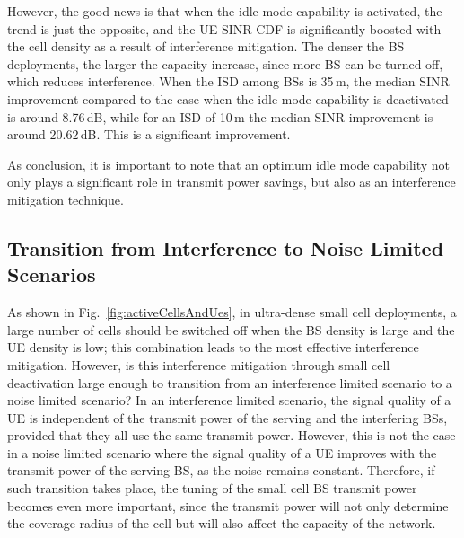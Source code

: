 \documentclass{IEEEtran}
\begin{document}
However, the good news is that when the idle mode capability is activated,
the trend is just the opposite,
and the \ac{UE} \ac{SINR} \ac{CDF} is significantly boosted with the cell density as a result of interference mitigation.
The denser the \ac{BS} deployments, the larger the capacity increase,
since more \ac{BS} can be turned off,
which reduces interference.
When the \ac{ISD} among \acp{BS} is 35\,m,
the median \ac{SINR} improvement compared to the case when the idle mode capability is deactivated is around 8.76\,dB,
while for an \ac{ISD} of 10\,m
the median \ac{SINR} improvement is around 20.62\,dB.
This is a significant improvement.


As conclusion, it is important to note that an optimum idle mode capability not only plays a significant role in transmit power savings,
but also as an interference mitigation technique.

\begin{figure*}[t]
  \centering
  \caption{UE SINR CDF in ultra-dense small cell deployments with
  large \ac{BS} densities, 35, 20, 10 and 5\,m,
  low \ac{UE} densities, 100 and 600 active \acp{UE} per km
  and \ac{SNR} targets, 15,12 and 9.
   The rest of the parameters are =1, , \,GHz, and .}
  \label{fig:transition}
\end{figure*}

\subsection{Transition from Interference to Noise Limited Scenarios}

As shown in Fig.~\ref{fig:activeCellsAndUes},
in ultra-dense small cell deployments,
a large number of cells should be switched off
when the \ac{BS} density is large and the \ac{UE} density is low;
this combination leads to the most effective interference mitigation.
However, is this interference mitigation through small cell deactivation large enough
to transition from an interference limited scenario to a noise limited scenario?
In an interference limited scenario,
the signal quality of a \ac{UE} is independent of the transmit power of the serving and the interfering \acp{BS},
provided that they all use the same transmit power.
However, this is not the case in a noise limited scenario
where the signal quality of a \ac{UE} improves with the transmit power of the serving \ac{BS},
as the noise remains constant.
Therefore, if such transition takes place,
the tuning of the small cell \ac{BS} transmit power becomes even more important,
since the transmit power will not only determine the coverage radius of the cell but will also affect the capacity of the network.
\end{document}
